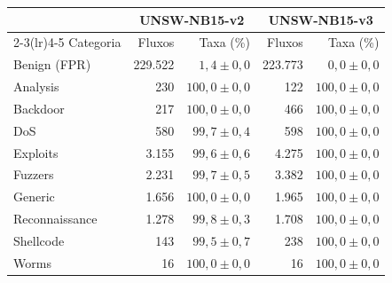 \begin{tabular}{lrrrr}
\toprule
& \multicolumn{2}{c}{UNSW-NB15-v2} & \multicolumn{2}{c}{UNSW-NB15-v3} \\
\cmidrule(lr){2-3}\cmidrule(lr){4-5}
Categoria & Fluxos & Taxa (\%) & Fluxos & Taxa (\%) \\
\midrule
Benign (FPR) & 229.522 & $1,4 \pm 0,0$ & 223.773 & $0,0 \pm 0,0$ \\
\midrule
Analysis & 230 & $100,0 \pm 0,0$ & 122 & $100,0 \pm 0,0$ \\
Backdoor & 217 & $100,0 \pm 0,0$ & 466 & $100,0 \pm 0,0$ \\
DoS & 580 & $99,7 \pm 0,4$ & 598 & $100,0 \pm 0,0$ \\
Exploits & 3.155 & $99,6 \pm 0,6$ & 4.275 & $100,0 \pm 0,0$ \\
Fuzzers & 2.231 & $99,7 \pm 0,5$ & 3.382 & $100,0 \pm 0,0$ \\
Generic & 1.656 & $100,0 \pm 0,0$ & 1.965 & $100,0 \pm 0,0$ \\
Reconnaissance & 1.278 & $99,8 \pm 0,3$ & 1.708 & $100,0 \pm 0,0$ \\
Shellcode & 143 & $99,5 \pm 0,7$ & 238 & $100,0 \pm 0,0$ \\
Worms & 16 & $100,0 \pm 0,0$ & 16 & $100,0 \pm 0,0$ \\
\bottomrule
\end{tabular}

